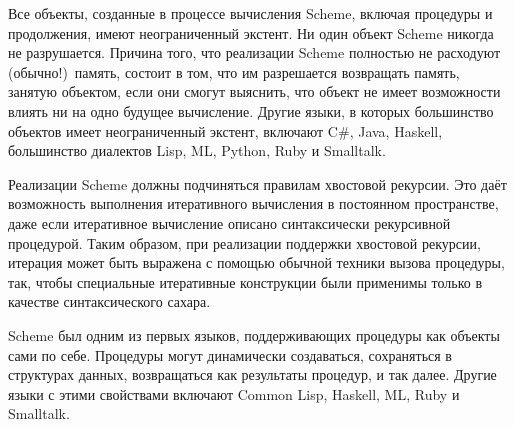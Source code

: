 \vest Все объекты, созданные в процессе вычисления Scheme, включая процедуры и продолжения,
имеют неограниченный экстент. Ни один объект Scheme никогда не разрушается. Причина того, что
реализации Scheme полностью не расходуют (обычно!)\ память, состоит в том, что им разрешается
возвращать память, занятую объектом, если они смогут выяснить, что объект не имеет возможности
влиять ни на одно будущее вычисление. Другие языки, в которых большинство объектов имеет
неограниченный экстент, включают C\#, Java, Haskell, большинство диалектов Lisp, ML, Python,
Ruby и Smalltalk.

Реализации Scheme должны подчиняться правилам хвостовой рекурсии. Это даёт возможность
выполнения итеративного вычисления в постоянном пространстве, даже если итеративное вычисление
описано синтаксически рекурсивной процедурой. Таким образом, при реализации
поддержки хвостовой рекурсии, итерация может быть выражена с помощью обычной техники вызова
процедуры, так, чтобы специальные итеративные конструкции были применимы только в качестве
синтаксического сахара.

\vest Scheme был одним из первых языков, поддерживающих процедуры как объекты сами по себе.
Процедуры могут динамически создаваться, сохраняться в структурах данных, возвращаться как
результаты процедур, и так далее. Другие языки с этими свойствами включают Common Lisp,
Haskell, ML, Ruby и Smalltalk.

